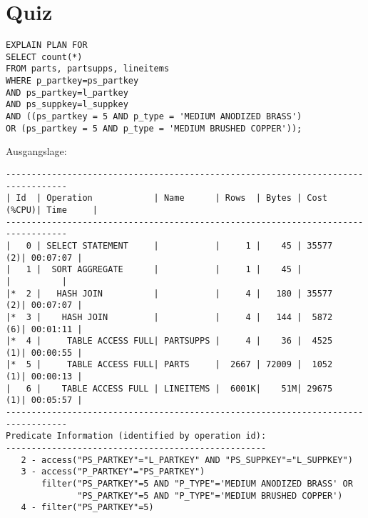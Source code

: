 \documentclass[10pt]{article}
\begin{document}
\section{Quiz}
\begin{lstlisting}[style=sql]
EXPLAIN PLAN FOR
SELECT count(*)
FROM parts, partsupps, lineitems
WHERE p_partkey=ps_partkey
AND ps_partkey=l_partkey
AND ps_suppkey=l_suppkey
AND ((ps_partkey = 5 AND p_type = 'MEDIUM ANODIZED BRASS')
OR (ps_partkey = 5 AND p_type = 'MEDIUM BRUSHED COPPER'));
\end{lstlisting}
Ausgangslage:
\begin{lstlisting}[style=queryexecutionplan]
----------------------------------------------------------------------------------
| Id  | Operation            | Name      | Rows  | Bytes | Cost (%CPU)| Time     |
----------------------------------------------------------------------------------
|   0 | SELECT STATEMENT     |           |     1 |    45 | 35577   (2)| 00:07:07 |
|   1 |  SORT AGGREGATE      |           |     1 |    45 |            |          |
|*  2 |   HASH JOIN          |           |     4 |   180 | 35577   (2)| 00:07:07 |
|*  3 |    HASH JOIN         |           |     4 |   144 |  5872   (6)| 00:01:11 |
|*  4 |     TABLE ACCESS FULL| PARTSUPPS |     4 |    36 |  4525   (1)| 00:00:55 |
|*  5 |     TABLE ACCESS FULL| PARTS     |  2667 | 72009 |  1052   (1)| 00:00:13 |
|   6 |    TABLE ACCESS FULL | LINEITEMS |  6001K|    51M| 29675   (1)| 00:05:57 |
----------------------------------------------------------------------------------
Predicate Information (identified by operation id):
--------------------------------------------------- 
   2 - access("PS_PARTKEY"="L_PARTKEY" AND "PS_SUPPKEY"="L_SUPPKEY")
   3 - access("P_PARTKEY"="PS_PARTKEY")
       filter("PS_PARTKEY"=5 AND "P_TYPE"='MEDIUM ANODIZED BRASS' OR 
              "PS_PARTKEY"=5 AND "P_TYPE"='MEDIUM BRUSHED COPPER')
   4 - filter("PS_PARTKEY"=5)
\end{lstlisting}
\end{document}
